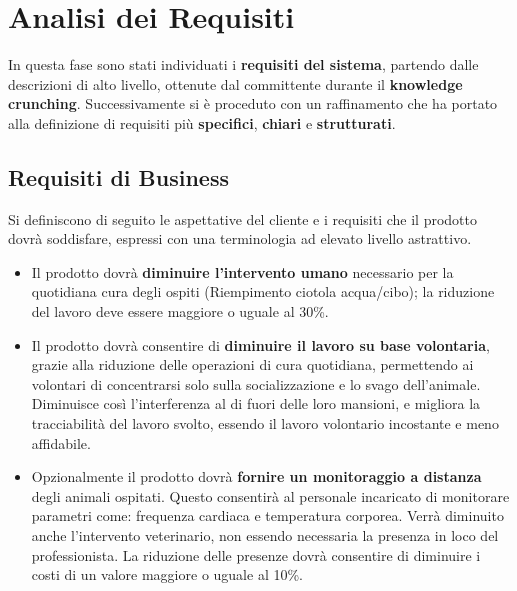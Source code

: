 

\chapter{Analisi dei Requisiti}
In questa fase sono stati individuati i \textbf{requisiti del sistema}, partendo dalle descrizioni di alto livello, ottenute dal committente durante il \textbf{knowledge crunching}. Successivamente si è proceduto con un raffinamento che ha portato alla definizione di requisiti più \textbf{specifici}, \textbf{chiari} e \textbf{strutturati}.
	\section{Requisiti di Business}
	Si definiscono di seguito le aspettative del cliente e i requisiti che il prodotto dovrà soddisfare, espressi con una terminologia ad elevato livello astrattivo.
        \begin{itemize}
            \item Il prodotto dovrà \textbf{diminuire l'intervento umano} necessario per la quotidiana cura degli ospiti (Riempimento ciotola acqua/cibo); la riduzione del lavoro deve essere maggiore o uguale al 30\%.
            \item Il prodotto dovrà consentire di \textbf{diminuire il lavoro su base volontaria}, grazie alla riduzione delle operazioni di cura quotidiana, permettendo ai volontari di concentrarsi solo sulla socializzazione e lo svago dell'animale.
            Diminuisce così l'interferenza al di fuori delle loro mansioni, e migliora la tracciabilità del lavoro svolto, essendo il lavoro volontario incostante e meno affidabile.
            \item Opzionalmente il prodotto dovrà \textbf{fornire un monitoraggio a distanza} degli animali ospitati.
            Questo consentirà al personale incaricato di monitorare parametri come: frequenza cardiaca e temperatura corporea. Verrà diminuito anche l'intervento veterinario, non essendo necessaria la presenza in loco del professionista. La riduzione delle presenze dovrà consentire di diminuire i costi di un valore maggiore o uguale al 10\%.
        \end{itemize}
	

